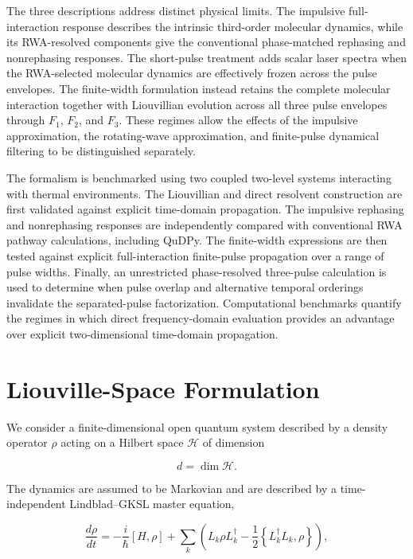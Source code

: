 \documentclass[11pt]{article}
\begin{document}
The three descriptions address distinct physical limits. The
impulsive full-interaction response describes the intrinsic
third-order molecular dynamics, while its RWA-resolved components give
the conventional phase-matched rephasing and nonrephasing responses.
The short-pulse treatment adds scalar laser spectra when the
RWA-selected molecular dynamics are effectively frozen across the
pulse envelopes. The finite-width formulation instead retains the
complete molecular interaction together with Liouvillian evolution
across all three pulse envelopes through $F_1$, $F_2$, and $F_3$.
These regimes allow the effects of the impulsive approximation, the
rotating-wave approximation, and finite-pulse dynamical filtering to
be distinguished separately.

The formalism is benchmarked using two coupled two-level systems
interacting with thermal environments. The Liouvillian and direct
resolvent construction are first validated against explicit
time-domain propagation. The impulsive rephasing and nonrephasing
responses are independently compared with conventional RWA pathway
calculations, including QuDPy. The finite-width expressions are then
tested against explicit full-interaction finite-pulse propagation over
a range of pulse widths. Finally, an unrestricted phase-resolved
three-pulse calculation is used to determine when pulse overlap and
alternative temporal orderings invalidate the separated-pulse
factorization. Computational benchmarks quantify the regimes in which
direct frequency-domain evaluation provides an advantage over explicit
two-dimensional time-domain propagation.
\section{Liouville-Space Formulation}
\label{sec:liouville}

We consider a finite-dimensional open quantum system described by a
density operator $\rho$ acting on a Hilbert space $\mathcal{H}$ of
dimension

\begin{equation}
d=\dim\mathcal{H}.
\end{equation}

The dynamics are assumed to be Markovian and are described by a
time-independent Lindblad--GKSL master equation,

\begin{equation}
\frac{d\rho}{dt}
=
-\frac{i}{\hbar}[H,\rho]
+
\sum_k
\left(
L_k\rho L_k^\dagger
-
\frac{1}{2}
\left\{
L_k^\dagger L_k,\rho
\right\}
\right),
\label{eq:lindblad_master}
\end{equation}
\end{document}
